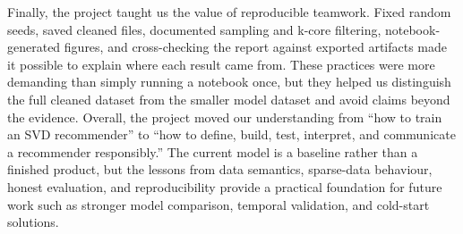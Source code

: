 \documentclass[12pt,a4paper]{article}
\begin{document}
Finally, the project taught us the value of reproducible teamwork. Fixed random seeds, saved cleaned files, documented sampling and k-core filtering, notebook-generated figures, and cross-checking the report against exported artifacts made it possible to explain where each result came from. These practices were more demanding than simply running a notebook once, but they helped us distinguish the full cleaned dataset from the smaller model dataset and avoid claims beyond the evidence. Overall, the project moved our understanding from ``how to train an SVD recommender'' to ``how to define, build, test, interpret, and communicate a recommender responsibly.'' The current model is a baseline rather than a finished product, but the lessons from data semantics, sparse-data behaviour, honest evaluation, and reproducibility provide a practical foundation for future work such as stronger model comparison, temporal validation, and cold-start solutions.


\printbibliography[title={References}]
\end{document}
